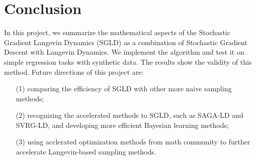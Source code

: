\documentclass[10pt]{amsart}
\begin{document}
\section{Conclusion}
In this project, we summarize the mathematical aspects of the Stochastic Gradient Langevin Dynamics (SGLD) as a combination of Stochastic Gradient Descent with Langevin Dynamics. We implement the algorithm and test it on simple regression tasks with synthetic data. The results show the validity of this method. Future directions of this project are:
\begin{itemize}
    \item[(1)] comparing the efficiency of SGLD with other more naive sampling methods;
    \item[(2)] recognizing the accelerated methods to SGLD, such as SAGA-LD and SVRG-LD, and developing more efficient Bayesian learning methods;
    \item[(3)] using acclerated optimization methods from math community to further accelerate Langevin-based sampling methods.
\end{itemize}



\end{document}
